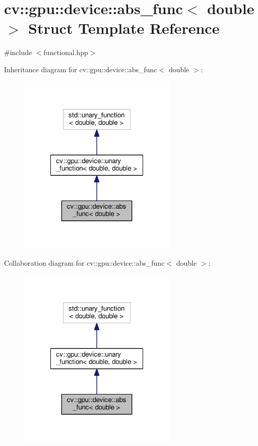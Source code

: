 \hypertarget{structcv_1_1gpu_1_1device_1_1abs__func_3_01double_01_4}{\section{cv\-:\-:gpu\-:\-:device\-:\-:abs\-\_\-func$<$ double $>$ Struct Template Reference}
\label{structcv_1_1gpu_1_1device_1_1abs__func_3_01double_01_4}
}


{\ttfamily \#include $<$functional.\-hpp$>$}



Inheritance diagram for cv\-:\-:gpu\-:\-:device\-:\-:abs\-\_\-func$<$ double $>$\-:\nopagebreak
\begin{figure}[H]
\begin{center}
\leavevmode
\includegraphics[width=216pt]{structcv_1_1gpu_1_1device_1_1abs__func_3_01double_01_4__inherit__graph}
\end{center}
\end{figure}


Collaboration diagram for cv\-:\-:gpu\-:\-:device\-:\-:abs\-\_\-func$<$ double $>$\-:\nopagebreak
\begin{figure}[H]
\begin{center}
\leavevmode
\includegraphics[width=216pt]{structcv_1_1gpu_1_1device_1_1abs__func_3_01double_01_4__coll__graph}
\end{center}
\end{figure}
